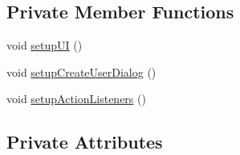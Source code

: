 \subsection*{Private Member Functions}
\begin{DoxyCompactItemize}
\item 
void \mbox{\hyperlink{classcom_1_1activitytracker_1_1_login_window_a7af9edf52b3028437e2159f0be9893a9}{setup\+UI}} ()
\item 
void \mbox{\hyperlink{classcom_1_1activitytracker_1_1_login_window_a567db7b15448fe9d9c76addbcee4092b}{setup\+Create\+User\+Dialog}} ()
\item 
void \mbox{\hyperlink{classcom_1_1activitytracker_1_1_login_window_af1ff236b841c51bfb49e143344a3c3ac}{setup\+Action\+Listeners}} ()
\end{DoxyCompactItemize}
\subsection*{Private Attributes}
